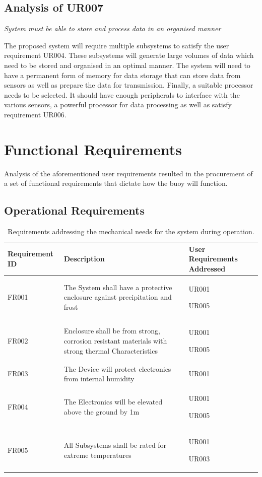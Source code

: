 \subsection{Analysis of UR007}

\textit{System must be able to store and process data in an organised manner}

The proposed system will require multiple subsystems to satisfy the user requirement UR004. These subsystems will generate large volumes of data which need to be stored and organised in an optimal manner. The system will need to have a permanent form of memory for data storage that can store data from sensors as well as prepare the data for transmission. Finally, a suitable processor needs to be selected. It should have enough peripherals to interface with the various sensors, a powerful processor for data processing as well as satisfy requirement UR006.

\section{Functional Requirements}
\label{sec:ch3_FR}
Analysis of the aforementioned user requirements resulted in the procurement of a set of functional requirements that dictate how the buoy will function.

\subsection{Operational Requirements }

\begin{table}[H]
    \centering
    \caption{Requirements addressing the mechanical needs for the system during operation.}
    \begin{tabular}{|>{\centering}m{}|>{\RaggedRight}m{}| >{\RaggedRight}m{} |}
    \hline
         Requirement ID & Description & User Requirements Addressed\\
         \hline
         FR001 & The System shall have a protective enclosure against precipitation and frost & UR001 \par UR005 \\
         \hline
         FR002 & Enclosure shall be from strong, corrosion resistant materials with strong thermal Characteristics &  UR001\par UR005 \\
         \hline
         FR003 & The Device will protect electronics from internal humidity & UR001\\
         \hline 
         FR004 & The Electronics will be elevated above the ground by 1m & UR001\par UR005 \\
         \hline
        FR005 & All Subsystems shall be rated for extreme temperatures & UR001\par UR003\\
         \hline
    \end{tabular}

    \label{tab:hard_funcreqsl}
\end{table}


